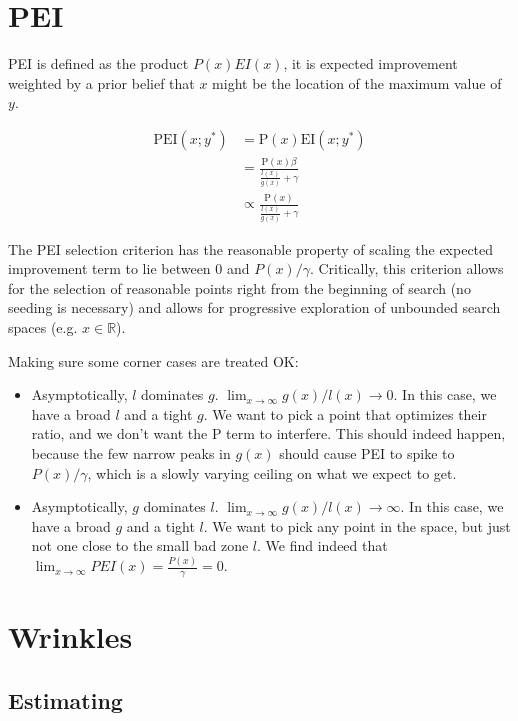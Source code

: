 \documentclass{article}
\begin{document}
\section{PEI}

PEI is defined as the product $P(x) EI(x)$, it is expected improvement weighted by a prior belief that $x$ might be the location of the maximum value of $y$.

\begin{align}
\mathrm{PEI}(x; y^{*})
    &= \mathrm{P}(x) \mathrm{EI}(x; y^*) \\
    &= \frac{\mathrm{P}(x)\beta}{\frac{l(x)}{g(x)} + \gamma} \\
    &\propto \frac{\mathrm{P}(x)}{\frac{l(x)}{g(x)} + \gamma}
\end{align}

The PEI selection criterion has the reasonable property of scaling the expected improvement term to lie between 0 and $P(x)/\gamma$.
Critically, this criterion allows for the selection of reasonable points right from the beginning of search (no seeding is necessary)
and allows for progressive exploration of unbounded search spaces (e.g. $x \in \mathbb{R}$).

Making sure some corner cases are treated OK:
\begin{itemize}
\item Asymptotically, $l$ dominates $g$. 
    $\lim_{x \rightarrow \infty} g(x) / l(x) \rightarrow 0$.
    In this case, we have a broad $l$ and a tight $g$. We want to pick a point that optimizes their ratio, and we don't want the P term to interfere.
    This should indeed happen, because the few narrow peaks in $g(x)$ should cause PEI to spike to $P(x)/\gamma$, which is a slowly varying ceiling on what we expect to get.
\item Asymptotically, $g$ dominates $l$.
    $\lim_{x \rightarrow \infty} g(x) / l(x) \rightarrow \infty$.
    In this case, we have a broad $g$ and a tight $l$. We want to pick any point in the space, but just not one close to the small bad zone $l$.
    We find indeed that $\lim_{x \rightarrow \infty} PEI(x) = \frac{P(x)}{\gamma} = 0$.
\end{itemize}


\section{Wrinkles}

\subsection{Estimating \alpha}
\end{document}
